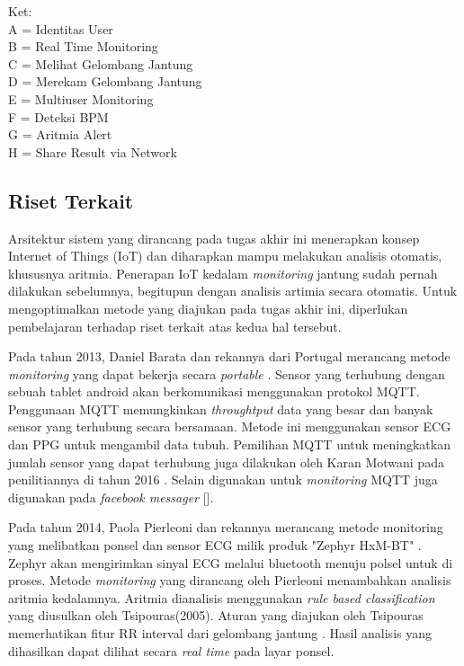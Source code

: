 Ket: \\
A = Identitas User \\
B = Real Time Monitoring \\
C = Melihat Gelombang Jantung \\
D = Merekam Gelombang Jantung \\
E = Multiuser Monitoring \\
F = Deteksi BPM \\
G = Aritmia Alert \\
H = Share Result via Network \\

\subsection{Riset Terkait}
Arsitektur sistem yang dirancang pada tugas akhir ini menerapkan konsep Internet of Things (IoT) dan diharapkan mampu melakukan analisis otomatis, khususnya aritmia. Penerapan IoT kedalam \textit{monitoring} jantung sudah pernah dilakukan sebelumnya, begitupun dengan analisis artimia secara otomatis. Untuk mengoptimalkan metode yang diajukan pada tugas akhir ini, diperlukan pembelajaran terhadap riset terkait atas kedua hal tersebut.

Pada tahun 2013, Daniel Barata dan rekannya dari Portugal merancang metode \textit{monitoring} yang dapat bekerja secara \textit{portable} \cite{daniel_barataa}. Sensor yang terhubung dengan sebuah tablet android akan berkomunikasi menggunakan protokol MQTT. Penggunaan MQTT memungkinkan \textit{throughtput} data yang besar dan banyak sensor yang terhubung secara bersamaan. Metode ini menggunakan sensor ECG dan PPG untuk mengambil data tubuh. Pemilihan MQTT untuk meningkatkan jumlah sensor yang dapat terhubung juga dilakukan oleh Karan Motwani pada penilitiannya di tahun 2016 \cite{karan_motwani}. Selain digunakan untuk \textit{monitoring} MQTT juga digunakan pada \textit{facebook messager} [].

Pada tahun 2014, Paola Pierleoni dan rekannya merancang metode monitoring yang melibatkan ponsel dan sensor ECG milik produk "Zephyr HxM-BT" \cite{paola_pierleoni}. Zephyr akan mengirimkan sinyal ECG melalui bluetooth menuju polsel untuk di proses. Metode \textit{monitoring} yang dirancang oleh Pierleoni menambahkan analisis aritmia kedalamnya. Aritmia dianalisis menggunakan \textit{rule based classification} yang diusulkan oleh Tsipouras(2005). Aturan yang diajukan oleh Tsipouras memerhatikan fitur RR interval dari gelombang jantung \cite{rr_classification}. Hasil analisis yang dihasilkan dapat dilihat secara \textit{real time} pada layar ponsel.

